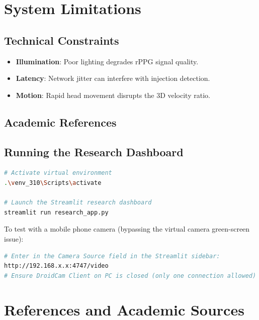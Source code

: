 \documentclass[12pt,a4paper]{report}
\begin{document}
\chapter{System Limitations}
\section{Technical Constraints}
\begin{itemize}
    \item \textbf{Illumination}: Poor lighting degrades rPPG signal quality.
    \item \textbf{Latency}: Network jitter can interfere with injection detection.
    \item \textbf{Motion}: Rapid head movement disrupts the 3D velocity ratio.
\end{itemize}

\section{Academic References}
\section{Running the Research Dashboard}
\begin{lstlisting}[language=bash, style=pythonstyle, caption={Launch command}]
# Activate virtual environment
.\venv_310\Scripts\activate

# Launch the Streamlit research dashboard
streamlit run research_app.py
\end{lstlisting}

To test with a mobile phone camera (bypassing the virtual camera green-screen issue):
\begin{lstlisting}[language=bash, style=pythonstyle, caption={Mobile IP Camera (DroidCam)}]
# Enter in the Camera Source field in the Streamlit sidebar:
http://192.168.x.x:4747/video
# Ensure DroidCam Client on PC is closed (only one connection allowed)
\end{lstlisting}

\chapter{References and Academic Sources}
\end{document}
